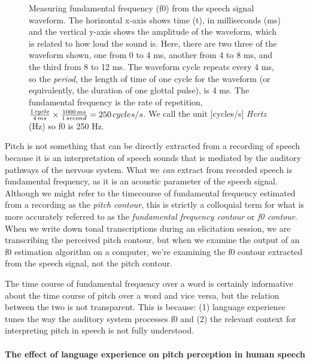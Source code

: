 \documentclass[12pt]{article}
\begin{document}
\begin{figure}
  \centering
  \caption{Measuring fundamental frequency (f0) from the speech signal
  waveform. The horizontal x-axis shows time (t), in milliseconds (ms)
  and the vertical y-axis shows the amplitude of the waveform, which
  is related to how loud the sound is. Here, there are two three of the waveform shown, one from
  0 to 4 ms, another from 4 to 8 ms, and the third from 8 to 12 ms. The waveform
  cycle repeats every 4 ms, so the \textit{period}, the length of
  time of one cycle for the waveform  (or equivalently, the duration of
  one glottal pulse),
  is 4 ms. The fundamental frequency is the rate of repetition,
  $\frac{1\,cycle}{4\,ms} \times \frac{1000\,ms}{1\,second}=250\thinspace 
  cycles/s$. We call the unit [cycles/s] \textit{Hertz} (Hz) so f0 is
  250 Hz.}
  \label{fig:period-tikz}
\end{figure}


 Pitch is not something that can be directly
extracted from a recording of speech because it is an interpretation
of speech sounds that is mediated by the auditory pathways of the nervous
system. What we \textit{can} extract from recorded speech is
fundamental frequency, as it is an acoustic parameter of the speech
signal. Although we might refer to the timecourse of fundamental
frequency estimated from a recording as the \textit{pitch contour},
this is strictly a colloquial term for what is more accurately
referred to as the
\textit{fundamental frequency contour} or \textit{f0 contour}. When we
write down tonal transcriptions during an elicitation session, we are
transcribing the perceived pitch contour, but when we examine the
output of an f0 estimation algorithm on a computer, we're examining
the f0 contour extracted from the speech signal, not the pitch contour.

The time course of fundamental frequency over a word is certainly
informative about the time course of pitch over a word and vice versa,
but the relation between the two is not transparent. This is because:
(1) language experience tunes the way the auditory system processes f0
and (2) the relevant context for interpreting pitch in speech is not
fully understood.

\paragraph{The effect of language experience on pitch perception in
  human speech}\hfill\break
\end{document}

